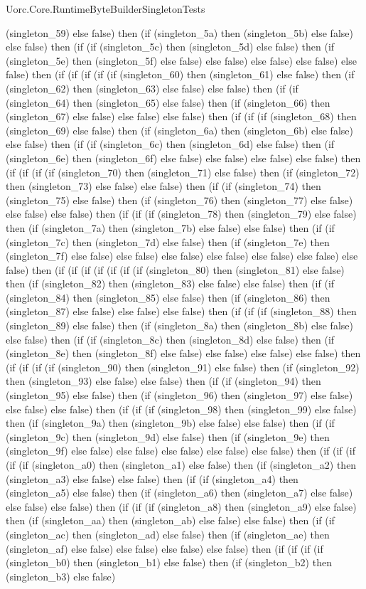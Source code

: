 \begin{lexlean}{Uorc.Core.RuntimeByteBuilderSingletonTests}
\begin{semanticmodule}
{(singleton_59) else false) then (if (singleton_5a) then (singleton_5b) else false) else false) then (if (if (singleton_5c) then (singleton_5d) else false) then (if (singleton_5e) then (singleton_5f) else false) else false) else false) else false) else false) then (if (if (if (if (if (singleton_60) then (singleton_61) else false) then (if (singleton_62) then (singleton_63) else false) else false) then (if (if (singleton_64) then (singleton_65) else false) then (if (singleton_66) then (singleton_67) else false) else false) else false) then (if (if (if (singleton_68) then (singleton_69) else false) then (if (singleton_6a) then (singleton_6b) else false) else false) then (if (if (singleton_6c) then (singleton_6d) else false) then (if (singleton_6e) then (singleton_6f) else false) else false) else false) else false) then (if (if (if (if (singleton_70) then (singleton_71) else false) then (if (singleton_72) then (singleton_73) else false) else false) then (if (if (singleton_74) then (singleton_75) else false) then (if (singleton_76) then (singleton_77) else false) else false) else false) then (if (if (if (singleton_78) then (singleton_79) else false) then (if (singleton_7a) then (singleton_7b) else false) else false) then (if (if (singleton_7c) then (singleton_7d) else false) then (if (singleton_7e) then (singleton_7f) else false) else false) else false) else false) else false) else false) else false) then (if (if (if (if (if (if (if (singleton_80) then (singleton_81) else false) then (if (singleton_82) then (singleton_83) else false) else false) then (if (if (singleton_84) then (singleton_85) else false) then (if (singleton_86) then (singleton_87) else false) else false) else false) then (if (if (if (singleton_88) then (singleton_89) else false) then (if (singleton_8a) then (singleton_8b) else false) else false) then (if (if (singleton_8c) then (singleton_8d) else false) then (if (singleton_8e) then (singleton_8f) else false) else false) else false) else false) then (if (if (if (if (singleton_90) then (singleton_91) else false) then (if (singleton_92) then (singleton_93) else false) else false) then (if (if (singleton_94) then (singleton_95) else false) then (if (singleton_96) then (singleton_97) else false) else false) else false) then (if (if (if (singleton_98) then (singleton_99) else false) then (if (singleton_9a) then (singleton_9b) else false) else false) then (if (if (singleton_9c) then (singleton_9d) else false) then (if (singleton_9e) then (singleton_9f) else false) else false) else false) else false) else false) then (if (if (if (if (if (singleton_a0) then (singleton_a1) else false) then (if (singleton_a2) then (singleton_a3) else false) else false) then (if (if (singleton_a4) then (singleton_a5) else false) then (if (singleton_a6) then (singleton_a7) else false) else false) else false) then (if (if (if (singleton_a8) then (singleton_a9) else false) then (if (singleton_aa) then (singleton_ab) else false) else false) then (if (if (singleton_ac) then (singleton_ad) else false) then (if (singleton_ae) then (singleton_af) else false) else false) else false) else false) then (if (if (if (if (singleton_b0) then (singleton_b1) else false) then (if (singleton_b2) then (singleton_b3) else false) }
\end{semanticmodule}
\end{lexlean}
